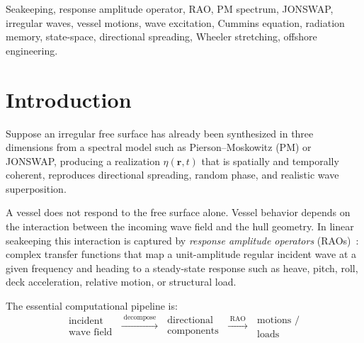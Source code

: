 \documentclass[journal,10pt,twocolumn]{IEEEtran}
\newcommand{\vect}[1]{\bm{#1}}
\begin{document}
    \begin{IEEEkeywords}
        Seakeeping, response amplitude operator, RAO, PM spectrum, JONSWAP,
        irregular waves, vessel motions, wave excitation, Cummins equation,
        radiation memory, state-space, directional spreading, Wheeler stretching,
        offshore engineering.
    \end{IEEEkeywords}

    \section{Introduction}
    \label{sec:intro}

    Suppose an irregular free surface has already been synthesized in three dimensions from a
    spectral model such as Pierson--Moskowitz (PM) or JONSWAP, producing a realization
    $\eta(\vect{r},t)$ that is spatially and temporally coherent, reproduces directional
    spreading, random phase, and realistic wave superposition.

    A vessel does not respond to the free surface alone.
    Vessel behavior depends on the interaction between the incoming wave field and the hull
    geometry.
    In linear seakeeping this interaction is captured by \emph{response amplitude operators}
    (RAOs)~\cite{Faltinsen,Newman}: complex transfer functions that map a unit-amplitude
    regular incident wave at a given frequency and heading to a steady-state response such
    as heave, pitch, roll, deck acceleration, relative motion, or structural load.

    The essential computational pipeline is:
    \begin{equation}
        \boxed{
            \substack{\displaystyle\text{incident}\\[1pt]\displaystyle\text{wave field}}
            \;\xrightarrow{\;\text{decompose}\;}\;
            \substack{\displaystyle\text{directional}\\[1pt]\displaystyle\text{components}}
            \;\xrightarrow{\;\text{RAO}\;}\;
            \substack{\displaystyle\text{motions /}\\[1pt]\displaystyle\text{loads}}
        }
        \label{eq:pipeline}
    \end{equation}
\end{document}
